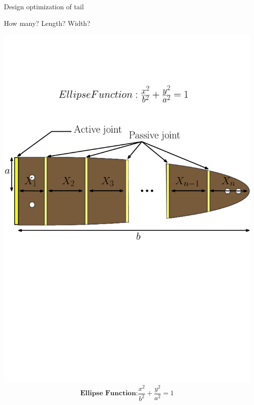 \documentclass[aspectratio=169, xcolor=table]{beamer}
\begin{document}
\begin{frame}{Design optimization of tail}
\begin{block}{How many? \qquad\qquad Length? \qquad\qquad Width?}
\begin{center}
\includegraphics[scale=0.45]{Tail1.pdf}
\begin{equation*}
\textbf{Ellipse Function:}  \dfrac{x^2}{b^2} + \dfrac{y^2}{a^2} = 1
\end{equation*}
\end{center}
\end{block}
\end{frame}
\end{document}
